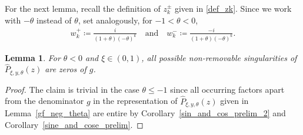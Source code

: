 \documentclass[12pt]{article}
\newcommand{\1}{\mathds{1}}
\theoremstyle{definition}
\theoremstyle{plain}
\newtheorem{Lemma}[definition]{Lemma}
\theoremstyle{remark}
\begin{document}
For the next lemma, recall the definition of $z_k^\pm$ given in \eqref{def_zk}. Since we work with $-\theta$ instead of $\theta$, set analogously, for $-1<\theta<0$,
\begin{align*}
       w_k^+\coloneqq \frac{i}{(1+\theta)(-\theta)^k}\quad\text{and}\quad w_k^-\coloneqq \frac{-i}{(1+\theta)(-\theta)^k}.
   \end{align*}
\begin{Lemma}\label{poles_hatP_theta}
      For $\theta<0$ and $\xi\in(0,1)$, all possible non-removable singularities of $\hat{P}_{\xi,y,\theta}(z)$ are zeros of $g$. 
\end{Lemma}
\begin{proof} 
The claim is trivial in the case $\theta\le-1$ since all occurring factors apart from the denominator $g$ in the representation of $\hat{P}_{\xi,y,\theta}(z)$ given in Lemma~\ref{gf_neg_theta} are entire by Corollary~\ref{sin_and_cos_prelim_2} and Corollary~\ref{sine_and_cose_prelim}. 


\end{proof}
\end{document}
